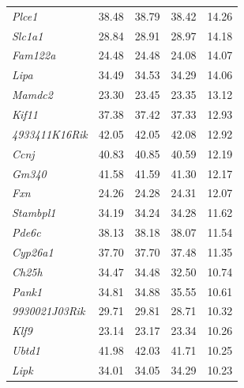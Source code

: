 \documentclass[oneside]{book}\usepackage[]{graphicx}\usepackage[]{color}
\begin{document}
\begin{appendices}
\begin{table}[ht]
\begin{tabular}{>{\em}lrrrr}
  Plce1 & 38.48 & 38.79 & 38.42 & 14.26 \\
  Slc1a1 & 28.84 & 28.91 & 28.97 & 14.18 \\
  Fam122a & 24.48 & 24.48 & 24.08 & 14.07 \\
  Lipa & 34.49 & 34.53 & 34.29 & 14.06 \\
  Mamdc2 & 23.30 & 23.45 & 23.35 & 13.12 \\
  Kif11 & 37.38 & 37.42 & 37.33 & 12.93 \\
  4933411K16Rik & 42.05 & 42.05 & 42.08 & 12.92 \\
  Ccnj & 40.83 & 40.85 & 40.59 & 12.19 \\
  Gm340 & 41.58 & 41.59 & 41.30 & 12.17 \\
  Fxn & 24.26 & 24.28 & 24.31 & 12.07 \\
  Stambpl1 & 34.19 & 34.24 & 34.28 & 11.62 \\
  Pde6c & 38.13 & 38.18 & 38.07 & 11.54 \\
  Cyp26a1 & 37.70 & 37.70 & 37.48 & 11.35 \\
  Ch25h & 34.47 & 34.48 & 32.50 & 10.74 \\
  Pank1 & 34.81 & 34.88 & 35.55 & 10.61 \\
  9930021J03Rik & 29.71 & 29.81 & 28.71 & 10.32 \\
  Klf9 & 23.14 & 23.17 & 23.34 & 10.26 \\
  Ubtd1 & 41.98 & 42.03 & 41.71 & 10.25 \\
  Lipk & 34.01 & 34.05 & 34.29 & 10.23 \\
   \hline
\end{tabular}
\endgroup
\end{table}


\end{appendices}
\end{document}
